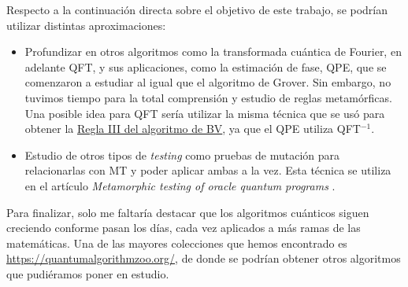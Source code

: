 \newpage
Respecto a la continuación directa sobre el objetivo de este trabajo, se podrían utilizar distintas aproximaciones:

\begin{itemize}
    \item Profundizar en otros algoritmos como la transformada cuántica de Fourier, en adelante QFT, y sus aplicaciones, como la estimación de fase, QPE, que se comenzaron a estudiar al igual que el algoritmo de Grover. Sin embargo, no tuvimos tiempo para la total comprensión y estudio de reglas metamórficas. Una posible idea para QFT sería utilizar la misma técnica que se usó para obtener la \hyperref[RIII:BV]{Regla III del algoritmo de BV}, ya que el QPE utiliza QFT$^{-1}$.

    \item Estudio de otros tipos de \textit{testing} como pruebas de mutación para relacionarlas con MT y poder aplicar ambas a la vez. Esta técnica se  utiliza en el artículo \textit{Metamorphic testing of oracle quantum programs} \cite{metamorphicAdd:2022}.
\end{itemize}

Para finalizar, solo me faltaría destacar que los algoritmos cuánticos siguen creciendo conforme pasan los días, cada vez aplicados a más ramas de las matemáticas. Una de las mayores colecciones que hemos encontrado es \url{https://quantumalgorithmzoo.org/}, de donde se podrían obtener otros algoritmos que pudiéramos poner en estudio.